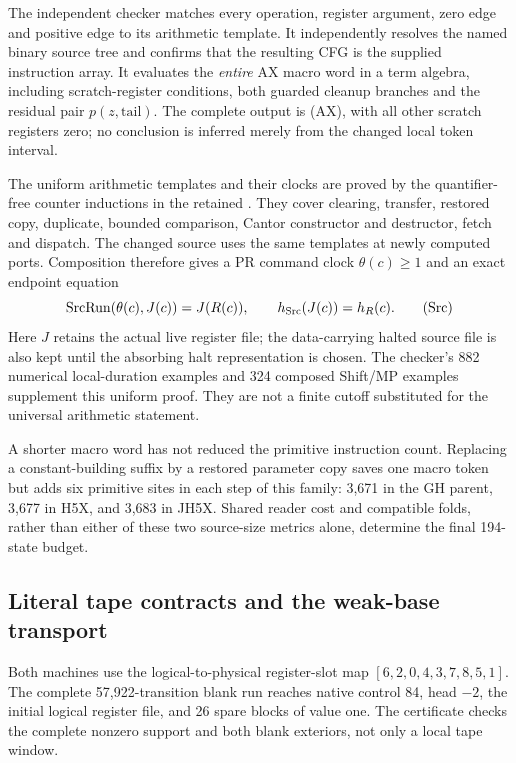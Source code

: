 The independent checker 
matches every operation, register argument, zero edge and positive edge
to its arithmetic template.  It independently resolves the named binary
source tree and confirms that the resulting CFG is the supplied instruction
array.  It evaluates the \emph{entire} AX macro word in a term algebra,
including scratch-register conditions, both guarded cleanup branches and
the residual pair $p(z,\mathrm{tail})$.  The complete output is (AX), with
all other scratch registers zero; no conclusion is inferred merely from
the changed local token interval.

The uniform arithmetic templates and their clocks are proved by the
quantifier-free counter inductions in the retained
.  They cover clearing, transfer,
restored copy, duplicate, bounded comparison, Cantor constructor and
destructor, fetch and dispatch.  The changed source uses the same
templates at newly computed ports.  Composition therefore gives a PR
command clock $\theta(c)\ge1$ and an exact endpoint equation
\[
 \operatorname{SrcRun}(\theta(c),J(c))=J(R(c)),
 \qquad h_{\rm Src}(J(c))=h_R(c).
 \tag{Src}
\]
Here $J$ retains the actual live register file; the data-carrying halted
source file is also kept until the absorbing halt representation is chosen.
The checker's 882 numerical local-duration examples and 324 composed
Shift/MP examples supplement this uniform proof.  They are not a finite
cutoff substituted for the universal arithmetic statement.

A shorter macro word has not reduced the primitive instruction count.
Replacing a constant-building suffix by a restored parameter copy saves
one macro token but adds six primitive sites in each step of this family:
3,671 in the GH parent, 3,677 in H5X, and 3,683 in JH5X.  Shared reader
cost and compatible folds, rather than either of these two source-size
metrics alone, determine the final 194-state budget.

\subsection{Literal tape contracts and the weak-base transport}

Both machines use the logical-to-physical register-slot map
$[6,2,0,4,3,7,8,5,1]$.  The complete 57,922-transition blank run reaches
native control 84, head $-2$, the initial logical register file, and
26 spare blocks of value one.  The certificate checks the complete
nonzero support and both blank exteriors, not only a local tape window.

